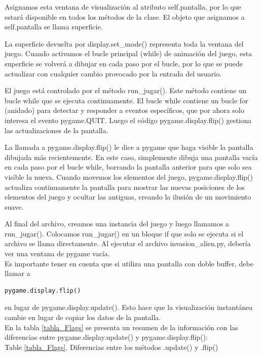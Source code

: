 {Asignamos esta ventana de visualización al atributo {\ttfamily self.pantalla}, por lo que estará disponible en todos los métodos
de la clase. El objeto que asignamos a {\ttfamily self.pantalla} se llama superficie. 

La superficie devuelta por {\ttfamily display.set\_mode()} representa toda la ventana del juego. Cuando activamos el bucle principal ({\ttfamily while}) de animación del juego, esta superficie se volverá a dibujar en cada paso por el bucle, por lo que se puede actualizar con cualquier cambio provocado por la entrada del usuario.

El juego está controlado por el método {\ttfamily run\_jugar()}. Este método contiene un bucle {\ttfamily while}  que se ejecuta continuamente. El bucle {\ttfamily while}   contiene un bucle {\ttfamily for }  (anidado) para detectar y responder a eventos específicos, que por ahora solo interesa el evento {\ttfamily pygame.QUIT}. 
Luego el código {\ttfamily pygame.display.flip()} gestiona las actualizaciones de la pantalla.

 
La llamada a {\ttfamily pygame.display.flip()} le dice a {\ttfamily pygame} que haga visible la pantalla dibujada más recientemente.
En este caso,  simplemente dibuja una pantalla vacía en cada paso por el bucle {\ttfamily while}, borrando la pantalla anterior 
para que solo sea visible la nueva. Cuando movemos los elementos del juego, {\ttfamily pygame.display.flip()} actualiza 
continuamente la pantalla para mostrar las nuevas posiciones de los elementos del juego y ocultar las antiguas, creando la
ilusión de un movimiento suave.

Al final del archivo, creamos una instancia del juego y luego llamamos a {\ttfamily run\_jugar()}. Colocamos {\ttfamily run\_jugar()} en un bloque  {\ttfamily if} que solo se ejecuta si el archivo se llama directamente. 
Al ejecutar el archivo {\ttfamily invasion\_alien.py}, debería ver una ventana de {\ttfamily pygame} vacía.\\
  

Es importante tener en cuenta que si utiliza una pantalla con doble {\ttfamily buffer}, debe llamar a
\begin{lstlisting}		
pygame.display.flip()
\end{lstlisting}
en lugar de {\ttfamily pygame.display.update()}. Esto hace que la visualización instantánea cambie en lugar de copiar los datos de la pantalla. \\


En la tabla \ref{tabla_Flags} se presenta un resumen de la información con las diferencias entre {\ttfamily pygame.display.update()} y 	{\ttfamily pygame.display.flip()}:\\

\noindent Table \ref{tabla_Flags}. Diferencias entre los métodos {\ttfamily .update()} y {}\ttfamily .flip()}\vspace{-0.25cm}
